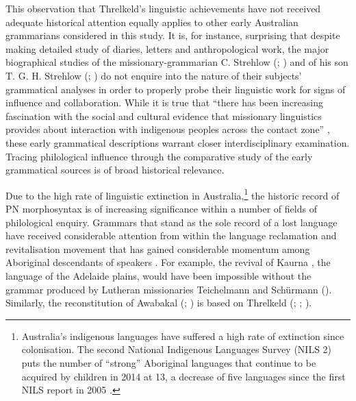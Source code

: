 This observation that Threlkeld’s linguistic achievements have not received adequate historical attention equally applies to other early Australian grammarians considered in this study. It is, for instance, surprising that despite making detailed study of diaries, letters and anthropological work, the major biographical studies of the missionary-grammarian C. Strehlow (\citealt{strehlow_tale_2011}; \citealt{kenny_arandas_2013}) and of his son T. G. H. Strehlow (\citealt{mcnally_aborigines_1981}; \citealt{hill_broken_2002}) do not enquire into the nature of their subjects’ grammatical analyses in order to properly probe their linguistic work for signs of influence and collaboration. While it is true that “there has been increasing fascination with the social and cultural evidence that missionary linguistics provides about interaction with indigenous peoples across the contact zone” \citep[13]{wafer_waiting_2011}, these early grammatical descriptions warrant closer interdisciplinary examination. Tracing philological influence through the comparative study of the early grammatical sources is of broad historical relevance.

Due to the high rate of linguistic extinction in Australia,\footnote{Australia’s indigenous languages have suffered a high rate of extinction since colonisation. The second National Indigenous Languages Survey (NILS 2) puts the number of “strong” Aboriginal languages that continue to be acquired by children in 2014 at 13, a decrease of five languages since the first NILS report in 2005 \citep[xii]{marmion_community_2014}.} the historic record of PN morphosyntax is of increasing significance within a number of fields of philological enquiry. Grammars that stand as the sole record of a lost language have received considerable attention from within the language reclamation and revitalisation movement that has gained considerable momentum among Aboriginal descendants of speakers \citep{hobson_re-awakening_2010}. For example, the revival of Kaurna \citep[2000]{amery_warrabarna_2016}, the language of the Adelaide plains, would have been impossible without the grammar produced by Lutheran missionaries Teichelmann and Schürmann (\citeyear{teichelmann_outlines_1840}). Similarly, the reconstitution of Awabakal (\citealt{lissarrague_salvage_2006}; \citealt{oppliger_phonology_1984}) is based on Threlkeld (\citeyear{threlkeld_specimens_1927}; \citeyear{threlkeld_australian_1834}; \citeyear{threlkeld_key_1850}).

